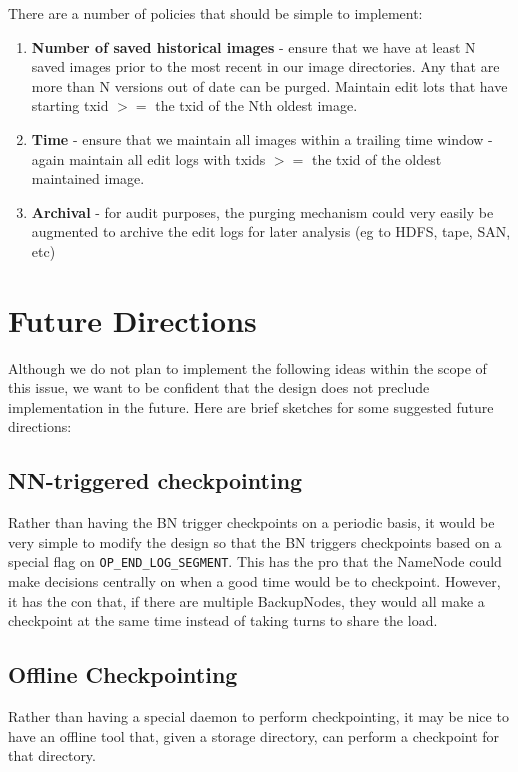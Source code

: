 \documentclass{article}
\begin{document}
There are a number of policies that should be simple to implement:
\begin{enumerate}
\item {\bf Number of saved historical images} - ensure that we have at least N saved images prior to the most recent in our image directories. Any that are more than N versions out of date can be purged. Maintain edit lots that have starting txid $>=$ the txid of the Nth oldest image.
\item {\bf Time} - ensure that we maintain all images within a trailing time window - again maintain all edit logs with txids $>=$ the txid of the oldest maintained image.
\item {\bf Archival} - for audit purposes, the purging mechanism could very easily be augmented to archive the edit logs for later analysis (eg to HDFS, tape, SAN, etc)
\end{enumerate}

\section{Future Directions}

Although we do not plan to implement the following ideas within the scope of this issue, we want to be confident that the design does not preclude implementation in the future. Here are brief sketches for some suggested future directions:

\subsection{NN-triggered checkpointing}

Rather than having the BN trigger checkpoints on a periodic basis, it would be very simple to modify the design so that the BN triggers checkpoints based on a special flag on {\tt OP\_END\_LOG\_SEGMENT}. This has the pro that the NameNode could make decisions centrally on when a good time would be to checkpoint. However, it has the con that, if there are multiple BackupNodes, they would all make a checkpoint at the same time instead of taking turns to share the load.

\subsection{Offline Checkpointing}

Rather than having a special daemon to perform checkpointing, it may be nice to have an offline tool that, given a storage directory, can perform a checkpoint for that directory.
\end{document}
